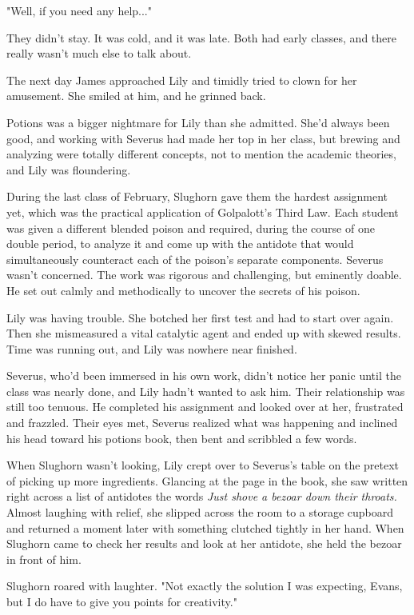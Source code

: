 \documentclass[a4paper,11pt]{article}
\begin{document}
"Well, if you need any help..."

They didn't stay. It was cold, and it was late. Both had early classes, and there really wasn't much else to talk about.

The next day James approached Lily and timidly tried to clown for her amusement. She smiled at him, and he grinned back.

Potions was a bigger nightmare for Lily than she admitted. She'd always been good, and working with Severus had made her top in her class, but brewing and analyzing were totally different concepts, not to mention the academic theories, and Lily was floundering.

During the last class of February, Slughorn gave them the hardest assignment yet, which was the practical application of Golpalott's Third Law. Each student was given a different blended poison and required, during the course of one double period, to analyze it and come up with the antidote that would simultaneously counteract each of the poison's separate components. Severus wasn't concerned. The work was rigorous and challenging, but eminently doable. He set out calmly and methodically to uncover the secrets of his poison.

Lily was having trouble. She botched her first test and had to start over again. Then she mismeasured a vital catalytic agent and ended up with skewed results. Time was running out, and Lily was nowhere near finished.

Severus, who'd been immersed in his own work, didn't notice her panic until the class was nearly done, and Lily hadn't wanted to ask him. Their relationship was still too tenuous. He completed his assignment and looked over at her, frustrated and frazzled. Their eyes met, Severus realized what was happening and inclined his head toward his potions book, then bent and scribbled a few words.

When Slughorn wasn't looking, Lily crept over to Severus's table on the pretext of picking up more ingredients. Glancing at the page in the book, she saw written right across a list of antidotes the words \emph{Just shove a bezoar down their throats.} Almost laughing with relief, she slipped across the room to a storage cupboard and returned a moment later with something clutched tightly in her hand. When Slughorn came to check her results and look at her antidote, she held the bezoar in front of him.

Slughorn roared with laughter. "Not exactly the solution I was expecting, Evans, but I do have to give you points for creativity."
\end{document}
